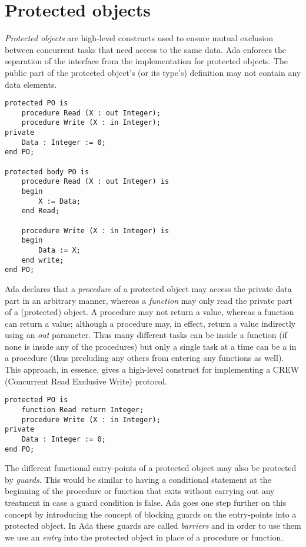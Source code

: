 \section{Protected objects}
\emph{Protected objects} are high-level constructs used to ensure
mutual exclusion between concurrent tasks that need access to the same
data. Ada enforces the separation of the interface from the
implementation for protected objects. The public part of the protected
object's (or its type's) definition may not contain any data elements.

\begin{minipage}{\listingwidth}
\lstset{language=ada}
\begin{lstlisting}[caption=Declaring a protected object with
    procedures,label=po_procs]
protected PO is
	procedure Read (X : out Integer);
	procedure Write (X : in Integer);
private
	Data : Integer := 0;
end PO;

protected body PO is
	procedure Read (X : out Integer) is
	begin
		X := Data;
	end Read;

	procedure Write (X : in Integer) is
	begin
		Data := X;
	end write;
end PO;
\end{lstlisting}
\end{minipage}

Ada declares that a \emph{procedure} of a protected object may access
the private data part in an arbitrary manner, whereas a
\emph{function} may only read the private part of a (protected)
object. A procedure may not return a value, whereas a function can
return a value; although a procedure may, in effect, return a value
indirectly using an \emph{out} parameter. Thus many different tasks
can be inside a function (if none is inside any of the procedures) but
only a single task at a time can be a in a procedure (thus precluding
any others from entering any functions as well). This approach, in
essence, gives a high-level construct for implementing a CREW
(Concurrent Read Exclusive Write) protocol.

\begin{minipage}{\listingwidth}
\lstset{language=ada}
\begin{lstlisting}[caption=Same protected object but with a function
    for improved parallelism,label=po_proc_and_func]
protected PO is
	function Read return Integer;
	procedure Write (X : in Integer);
private
	Data : Integer := 0;
end PO;
\end{lstlisting}
\end{minipage}

The different functional entry-points of a protected object may also
be protected by \emph{guards}. This would be similar to having a
conditional statement at the beginning of the procedure or function
that exits without carrying out any treatment in case a guard
condition is false. Ada goes one step further on this concept by
introducing the concept of blocking guards on the entry-points into a
protected object. In Ada these guards are called \emph{barriers} and
in order to use them we use an \emph{entry} into the protected object
in place of a procedure or function.

